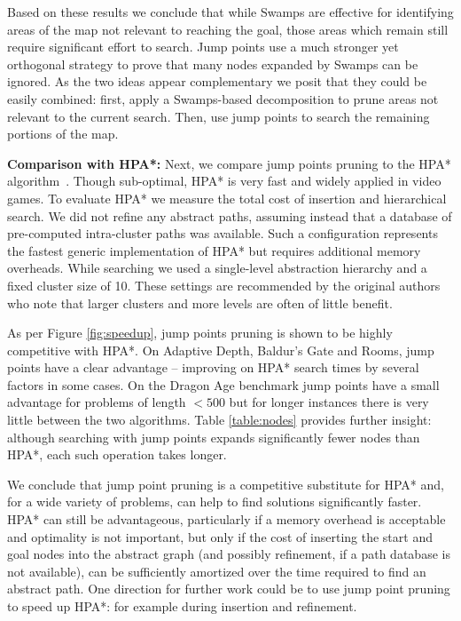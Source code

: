 Based on these results we conclude that while Swamps are effective for
identifying areas of the map not relevant to reaching the goal, those areas
which remain still require significant effort to search.  Jump points use a much
stronger yet orthogonal strategy to prove that many nodes expanded by Swamps can
be ignored.  As the two ideas appear complementary we posit that they could be
easily combined: first, apply a Swamps-based decomposition to prune areas not
relevant to the current search.  Then, use jump points to search the remaining
portions of the map.

\textbf{Comparison with HPA*: }
Next, we compare jump points pruning to the HPA* algorithm~\cite{botea04}.
Though sub-optimal, HPA* is very fast and widely applied in video games. 
To evaluate HPA* we measure the total cost
of insertion and hierarchical search. We did not refine any abstract paths,
assuming instead that a database of pre-computed intra-cluster paths was
available. Such a configuration represents the fastest generic implementation 
of HPA* but requires additional memory overheads. 
While searching we used a single-level abstraction hierarchy and a
fixed cluster size of 10.  These settings are recommended by the original
authors who note that larger clusters and more levels are often of little
benefit.

As per Figure \ref{fig:speedup}, jump points pruning is shown to be 
highly competitive with HPA*.
On Adaptive Depth, Baldur's Gate and Rooms, jump points have a clear advantage
-- improving on HPA* search times by several factors in some cases.
On the Dragon Age benchmark jump points have a small advantage for problems of 
length $< 500$ but for longer instances there is very little between the two
algorithms.
Table \ref{table:nodes} provides further insight: although searching with jump 
points expands significantly fewer nodes than HPA*, each such operation
takes longer.

We conclude that jump point pruning is a competitive substitute for HPA* and,
for a wide variety of problems, can help to find solutions significantly faster.
HPA*
can still be advantageous, particularly if a memory overhead is acceptable
and optimality is not important, but only if the cost of inserting the start and
goal nodes into the abstract graph (and possibly refinement, if a path database
is not available), can be sufficiently amortized over the time required to find an abstract
path.
One direction for further work could be to use jump
point pruning to speed up HPA*: for example during insertion and refinement.
